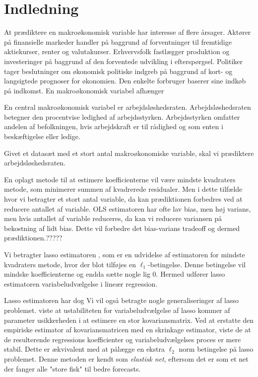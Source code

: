 \chapter{Indledning}
At prædiktere en makroøkonomisk variable har interesse af flere årsager.
Aktører på finansielle markeder handler på baggrund af forventninger til fremtidige aktiekurser, renter og valutakurser.
Erhvervsfolk fastlægger produktion og investeringer på baggrund af den forventede udvikling i efterspørgsel.
Politiker tager beslutninger om økonomisk politiske indgreb på baggrund af kort- og langsigtede prognoser for økonomien.
Den enkelte forbruger baserer sine indkøb på indkomst.
En makroøkonomisk variabel afhænger 

En central makroøkonomisk variabel er arbejdsløshedsraten.
Arbejdsløshedsraten betegner den procentvise ledighed af arbejdsstyrken.
Arbejdsstyrken omfatter andelen af befolkningen, hvis arbejdskraft er til rådighed og som enten i beskæftigelse eller ledige.

Givet et datasæt med et stort antal makroøkonomiske variable, skal vi prædiktere arbejdsløshedsraten.

En oplagt metode til at estimere koefficienterne vil være mindste kvadraters metode, som minimerer summen af kvadrerede residualer.
Men i dette tilfælde hvor vi betragter et stort antal variable, da kan prædiktionen forbedres ved at reducere antallet af variable.
OLS estimatoren har ofte lav bias, men høj varians, men hvis antallet af variable reduceres, da kan vi reducere variansen på bekostning af lidt bias.
Dette vil forbedre det bias-varians tradeoff og dermed prædiktionen.?????

Vi betragter lasso estimatoren \citep{lasso}, som er en udvidelse af estimatoren for mindste kvadraters metode, hvor der blot tilføjes en \(\ell_1\)-betingelse.
Denne betingelse vil mindske koefficienterne og endda sætte nogle lig 0.
Hermed udfører lasso estimatoren variabeludvælgelse i lineær regression.

Lasso estimatoren har dog
Vi vil også betragte nogle generaliseringer af lasso problemet.
\citep{zou_hastie} viste at ustabiliteten for variabeludvælgelse af lasso kommer af parameter usikkerheden i at estimere en stor kovariansmatrix.
Ved at erstatte den empiriske estimator af kovariansmatricen med en skrinkage estimator, viste de at de resulterende regressions koefficienter og variabeludvælgelses proces er mere stabil.
Dette er ækvivalent med at pålægge en ekstra \(\ell_2\) norm betingelse på lasso problemet.
Denne metoden er kendt som \textit{elastisk net}, eftersom det er som et net der fanger alle "store fisk" til bedre forecasts.

